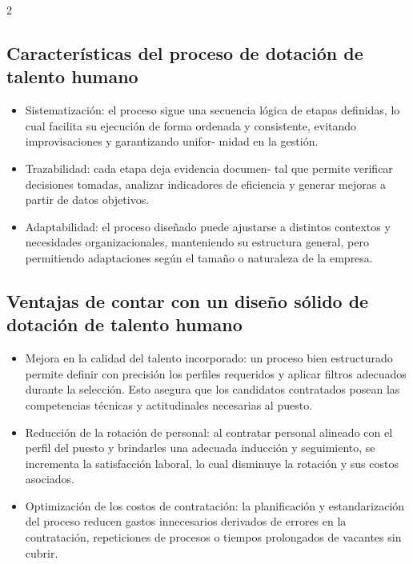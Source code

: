 \documentclass[12pt,spanish,Letterpaper,openany]{book}
\begin{document}
\begin {multicols}{2}
\hypertarget{caracteruxedsticas-del-proceso-de-dotaciuxf3n-de-talento-humano}{%
\subsection{Características del proceso de dotación de talento humano}\label{caracteruxedsticas-del-proceso-de-dotaciuxf3n-de-talento-humano}}

\begin{itemize}
\item
  Sistematización: el proceso sigue una secuencia lógica de etapas definidas, lo cual facilita su ejecución de forma ordenada y consistente, evitando improvisaciones y garantizando unifor-
  midad en la gestión.
\item
  Trazabilidad: cada etapa deja evidencia documen-
  tal que permite verificar decisiones tomadas, analizar indicadores de eficiencia y generar mejoras a partir de datos objetivos.
\item
  Adaptabilidad: el proceso diseñado puede ajustarse a distintos contextos y necesidades organizacionales, manteniendo su estructura general, pero permitiendo adaptaciones según el tamaño o naturaleza de la empresa.
\end{itemize}

\hypertarget{ventajas-de-contar-con-un-diseuxf1o-suxf3lido-de-dotaciuxf3n-de-talento-humano}{%
\subsection{Ventajas de contar con un diseño sólido de dotación de talento humano}\label{ventajas-de-contar-con-un-diseuxf1o-suxf3lido-de-dotaciuxf3n-de-talento-humano}}

\begin{itemize}
\item
  Mejora en la calidad del talento incorporado: un proceso bien estructurado permite definir con precisión los perfiles requeridos y aplicar filtros adecuados durante la selección. Esto asegura que los candidatos contratados posean las competencias técnicas y actitudinales necesarias al puesto.
\item
  Reducción de la rotación de personal: al contratar personal alineado con el perfil del puesto y brindarles una adecuada inducción y seguimiento, se incrementa la satisfacción laboral, lo cual disminuye la rotación y sus costos asociados.
\item
  Optimización de los costos de contratación: la planificación y estandarización del proceso reducen gastos innecesarios derivados de errores en la contratación, repeticiones de procesos o tiempos prolongados de vacantes sin cubrir.
\end{itemize}


\end{multicols}
\end{document}

